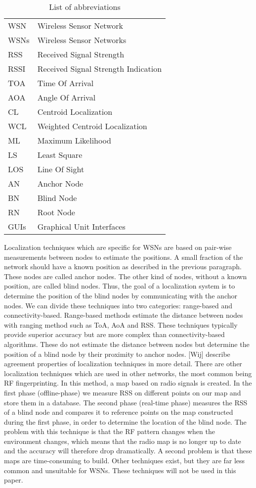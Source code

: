 \begin{table}[ht]
\caption{List of abbreviations}
\centering
\begin{tabular}{l l} \hline
	WSN 	& 	Wireless Sensor Network \\
	WSNs  &   Wireless Sensor Networks \\
	RSS 	& 	Received Signal Strength \\
	RSSI  &   Received Signal Strength Indication \\
	TOA   &		Time Of Arrival \\
	AOA   &   Angle Of Arrival \\
	CL 		& 	Centroid Localization \\
	WCL 	& 	Weighted Centroid Localization \\
	ML		&		Maximum Likelihood \\
	LS 		& 	Least Square \\
	LOS   &   Line Of Sight \\
	AN 		& 	Anchor Node \\
	BN 		& 	Blind Node \\
	RN    &   Root Node \\
	GUIs  &   Graphical Unit Interfaces \\ \hline
\end{tabular}
\end{table}

Localization techniques which are specific for WSNs are based on pair-wise measurements between nodes to estimate the positions. A small fraction of the network should have a known position as described in  the previous paragraph. These nodes are called anchor nodes. The other kind of nodes, without a known position, are called blind nodes. Thus, the goal of a localization system is to determine the position of the blind nodes by communicating with the anchor nodes. We can divide these techniques into two categories: range-based and connectivity-based. Range-based methods estimate the distance between nodes with ranging method such as ToA, AoA and RSS. These techniques typically provide superior accuracy but are more complex than connectivity-based  algorithms. These do not estimate the distance between nodes but determine the position of a blind node by their proximity to anchor nodes. \cite{hightower2001lsu}[Wij]  describe agreement properties of localization techniques in more detail. 
There are other localization techniques which are used in other networks, the most common being RF fingerprinting. In this method, a map based on radio signals is created. In the first phase (offline-phase) we measure RSS on different points on our map and store them in a database. The second phase (real-time phase) measures the RSS of a blind node and compares it to reference points on the map constructed during the first phase, in order to determine the location of the blind node. The problem with this technique is that the RF pattern changes when the environment changes, which means that the radio map is no longer up to date and the accuracy will therefore drop dramatically. A second problem is that these maps are time-consuming to build. Other techniques exist, but they are far less common and unsuitable for WSNs.  These techniques will not be used in this paper. 

